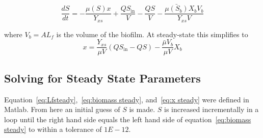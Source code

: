 \documentclass[letterpaper, twoside]{article}
\numberwithin{equation}{section}
\begin{document}
\begin{equation}
  \frac{dS}{dt} = -\frac{\mu(S) x }{Y_{xs}} + \frac{Q S_{\mathrm{in}}}{V} - \frac{Q S}{V} -\frac{\bar{\mu(S_b)} X_b V_b}{Y_{xs}{V}}
\end{equation}

where $V_b=A L_f$ is the volume of the biofilm.  At steady-state this simplifies to 
\begin{equation}
 \label{eq:x steady}
   x = \frac{Y_{xs}}{\mu V}\left(Q S_{\mathrm{in}} - Q S\right) -\frac{\bar{\mu} V_b}{\mu V}{X_b}
\end{equation}

\subsection{Solving for Steady State Parameters}
Equation~\ref{eq:Lfsteady},~\ref{eq:biomass steady}, and~\ref{eq:x steady} were defined in Matlab. From here an initial guess of $S$ is made. $S$ is increased incrementally in a loop until the right hand side equals the left hand side of equation~\ref{eq:biomass steady} to within a tolerance of $1E-12$.
\end{document}

